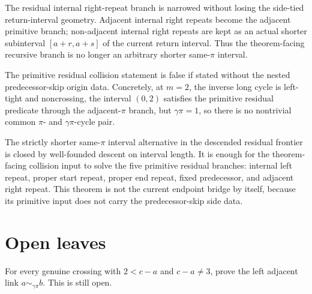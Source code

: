 \begin{theorem}
  \label{thm:skip-subinterval-descended-residual}
  \leanok
  The residual internal right-repeat branch is narrowed without losing the
  side-tied return-interval geometry.  Adjacent internal right repeats become
  the adjacent primitive branch; non-adjacent internal right repeats are kept
  as an actual shorter subinterval \([a+r,a+s]\) of the current return
  interval.  Thus the theorem-facing recursive branch is no longer an
  arbitrary shorter same-\(\pi\) interval.
\end{theorem}

\begin{theorem}
  \label{thm:loose-primitive-residual-no-go}
  \leanok
  The primitive residual collision statement is false if stated without the
  nested predecessor-skip origin data.  Concretely, at \(m=2\), the inverse
  long cycle is left-tight and noncrossing, the interval \((0,2)\) satisfies
  the primitive residual predicate through the adjacent-\(\pi\) branch, but
  \(\gamma\pi=1\), so there is no nontrivial common \(\pi\)- and
  \(\gamma\pi\)-cycle pair.
\end{theorem}

\begin{theorem}
  \label{thm:skip-primitive-residual}
  \leanok
  The strictly shorter same-\(\pi\) interval alternative in the descended
  residual frontier is closed by well-founded descent on interval length.  It
  is enough for the theorem-facing collision input to solve the five primitive
  residual branches: internal left repeat, proper start repeat, proper end
  repeat, fixed predecessor, and adjacent right repeat.  This theorem is not
  the current endpoint bridge by itself, because its primitive input does not
  carry the predecessor-skip side data.
\end{theorem}

\section{Open leaves}

\begin{theorem}
  \label{thm:open-large-gap-left}
  For every genuine crossing with \(2<c-a\) and \(c-a\ne3\), prove the left
  adjacent link \(a\sim_{\gamma\pi} b\).  This is still open.
\end{theorem}

